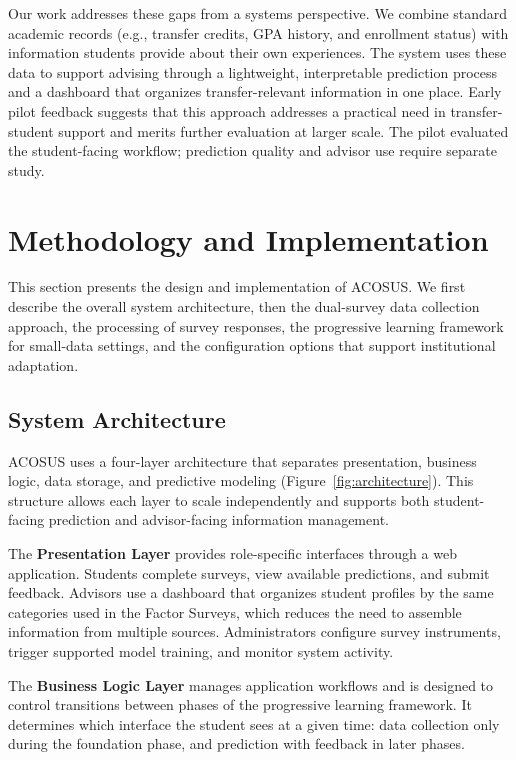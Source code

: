 \documentclass[letterpaper,11pt]{article}
\begin{document}
Our work addresses these gaps from a systems perspective. We combine standard academic records (e.g., transfer credits, GPA history, and enrollment status) with information students provide about their own experiences. The system uses these data to support advising through a lightweight, interpretable prediction process and a dashboard that organizes transfer-relevant information in one place. Early pilot feedback suggests that this approach addresses a practical need in transfer-student support and merits further evaluation at larger scale. The pilot evaluated the student-facing workflow; prediction quality and advisor use require separate study.

\section{Methodology and Implementation}\label{sec:methodology}

This section presents the design and implementation of ACOSUS. We first describe the overall system architecture, then the dual-survey data collection approach, the processing of survey responses, the progressive learning framework for small-data settings, and the configuration options that support institutional adaptation.

\subsection{System Architecture}\label{subsec:sysarch}

ACOSUS uses a four-layer architecture that separates presentation, business logic, data storage, and predictive modeling (Figure~\ref{fig:architecture}). This structure allows each layer to scale independently and supports both student-facing prediction and advisor-facing information management.

The \textbf{Presentation Layer} provides role-specific interfaces through a web application. Students complete surveys, view available predictions, and submit feedback. Advisors use a dashboard that organizes student profiles by the same categories used in the Factor Surveys, which reduces the need to assemble information from multiple sources. Administrators configure survey instruments, trigger supported model training, and monitor system activity.

The \textbf{Business Logic Layer} manages application workflows and is designed to control transitions between phases of the progressive learning framework. It determines which interface the student sees at a given time: data collection only during the foundation phase, and prediction with feedback in later phases.
\end{document}
